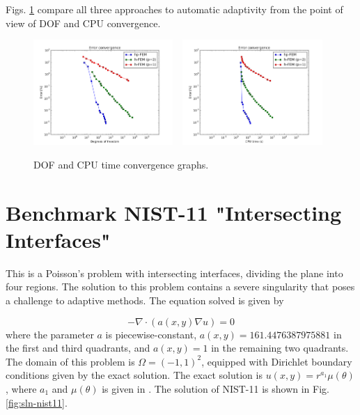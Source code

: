 \documentclass[12pt]{elsarticle}
\begin{document}
Figs. \ref{fig:nist-10-conv} compare all
three approaches to automatic adaptivity from the point
of view of DOF and CPU convergence.

\begin{figure}[H]
\centering
\includegraphics[height=4cm]{nist/nist-10/conv_dof_aniso.png}\ \
\includegraphics[height=4cm]{nist/nist-10/conv_cpu_aniso.png}
\caption{DOF and CPU time convergence graphs.}
\label{fig:nist-10-conv}
\end{figure}


\section{Benchmark NIST-11 "Intersecting Interfaces"}
\label{sec:bench-11}

This is a Poisson's problem with intersecting interfaces,
dividing the plane into four regions.
The solution to this problem contains a severe
singularity that poses a challenge to adaptive methods.
The equation solved is given by

\begin{equation} \label{intersecting}
-\nabla \cdot (a(x,y) \nabla u) = 0
\end{equation}
where the parameter $a$ is piecewise-constant,
$a(x,y) = 161.4476387975881$ in the first and third quadrants,
and $a(x,y) = 1$ in the remaining two quadrants.
The domain of this problem is $\Omega = (-1, 1)^2$, equipped with
Dirichlet boundary conditions given by the exact solution.
The exact solution is
$u(x,y) = r^{a_1} \mu (\theta)$,
where $a_1$ and $\mu (\theta)$ is given in \cite{mitchell-1}.
The solution of NIST-11 is shown in Fig. \ref{fig:sln-nist11}.
\end{document}
